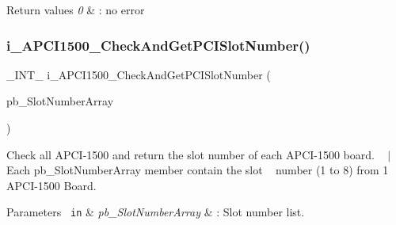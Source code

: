 \begin{DoxyRetVals}{Return values}
{\em 0} & \+: no error~\newline
\\
\hline
\end{DoxyRetVals}
\mbox{\label{group___general_functions_gade589c63a37eb3e97b01c64ef431f35a}} 
\subsubsection{\texorpdfstring{i\_APCI1500\_CheckAndGetPCISlotNumber()}{i\_APCI1500\_CheckAndGetPCISlotNumber()}}
{\footnotesize\ttfamily \+\_\+\+I\+N\+T\+\_\+ i\+\_\+\+A\+P\+C\+I1500\+\_\+\+Check\+And\+Get\+P\+C\+I\+Slot\+Number (\begin{DoxyParamCaption}\item[{P\+B\+Y\+T\+E\+\_\+}]{pb\+\_\+\+Slot\+Number\+Array }\end{DoxyParamCaption})}

Check all A\+P\+C\+I-\/1500 and return the slot number of each A\+P\+C\+I-\/1500 board. ~\newline
 $\vert$ Each pb\+\_\+\+Slot\+Number\+Array member contain the slot ~\newline
 number (1 to 8) from 1 A\+P\+C\+I-\/1500 Board. ~\newline



\begin{DoxyParams}[1]{Parameters}
\mbox{\texttt{ in}}  & {\em pb\+\_\+\+Slot\+Number\+Array} & \+: Slot number list. \\
\hline
\end{DoxyParams}

